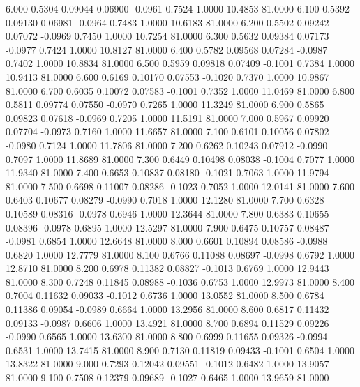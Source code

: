    6.000   0.5304   0.09044   0.06900  -0.0961   0.7524   1.0000  10.4853  81.0000
   6.100   0.5392   0.09130   0.06981  -0.0964   0.7483   1.0000  10.6183  81.0000
   6.200   0.5502   0.09242   0.07072  -0.0969   0.7450   1.0000  10.7254  81.0000
   6.300   0.5632   0.09384   0.07173  -0.0977   0.7424   1.0000  10.8127  81.0000
   6.400   0.5782   0.09568   0.07284  -0.0987   0.7402   1.0000  10.8834  81.0000
   6.500   0.5959   0.09818   0.07409  -0.1001   0.7384   1.0000  10.9413  81.0000
   6.600   0.6169   0.10170   0.07553  -0.1020   0.7370   1.0000  10.9867  81.0000
   6.700   0.6035   0.10072   0.07583  -0.1001   0.7352   1.0000  11.0469  81.0000
   6.800   0.5811   0.09774   0.07550  -0.0970   0.7265   1.0000  11.3249  81.0000
   6.900   0.5865   0.09823   0.07618  -0.0969   0.7205   1.0000  11.5191  81.0000
   7.000   0.5967   0.09920   0.07704  -0.0973   0.7160   1.0000  11.6657  81.0000
   7.100   0.6101   0.10056   0.07802  -0.0980   0.7124   1.0000  11.7806  81.0000
   7.200   0.6262   0.10243   0.07912  -0.0990   0.7097   1.0000  11.8689  81.0000
   7.300   0.6449   0.10498   0.08038  -0.1004   0.7077   1.0000  11.9340  81.0000
   7.400   0.6653   0.10837   0.08180  -0.1021   0.7063   1.0000  11.9794  81.0000
   7.500   0.6698   0.11007   0.08286  -0.1023   0.7052   1.0000  12.0141  81.0000
   7.600   0.6403   0.10677   0.08279  -0.0990   0.7018   1.0000  12.1280  81.0000
   7.700   0.6328   0.10589   0.08316  -0.0978   0.6946   1.0000  12.3644  81.0000
   7.800   0.6383   0.10655   0.08396  -0.0978   0.6895   1.0000  12.5297  81.0000
   7.900   0.6475   0.10757   0.08487  -0.0981   0.6854   1.0000  12.6648  81.0000
   8.000   0.6601   0.10894   0.08586  -0.0988   0.6820   1.0000  12.7779  81.0000
   8.100   0.6766   0.11088   0.08697  -0.0998   0.6792   1.0000  12.8710  81.0000
   8.200   0.6978   0.11382   0.08827  -0.1013   0.6769   1.0000  12.9443  81.0000
   8.300   0.7248   0.11845   0.08988  -0.1036   0.6753   1.0000  12.9973  81.0000
   8.400   0.7004   0.11632   0.09033  -0.1012   0.6736   1.0000  13.0552  81.0000
   8.500   0.6784   0.11386   0.09054  -0.0989   0.6664   1.0000  13.2956  81.0000
   8.600   0.6817   0.11432   0.09133  -0.0987   0.6606   1.0000  13.4921  81.0000
   8.700   0.6894   0.11529   0.09226  -0.0990   0.6565   1.0000  13.6300  81.0000
   8.800   0.6999   0.11655   0.09326  -0.0994   0.6531   1.0000  13.7415  81.0000
   8.900   0.7130   0.11819   0.09433  -0.1001   0.6504   1.0000  13.8322  81.0000
   9.000   0.7293   0.12042   0.09551  -0.1012   0.6482   1.0000  13.9057  81.0000
   9.100   0.7508   0.12379   0.09689  -0.1027   0.6465   1.0000  13.9659  81.0000
